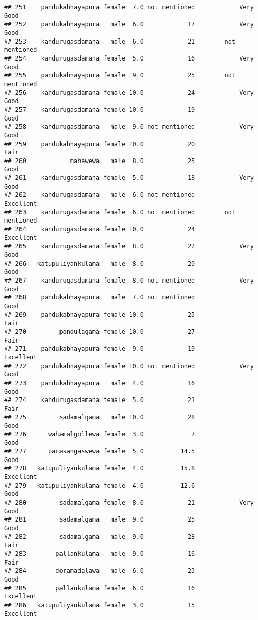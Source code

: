 \documentclass[
]{article}
\begin{document}
\begin{verbatim}
## 251    pandukabhayapura female  7.0 not mentioned            Very Good
## 252    pandukabhayapura   male  6.0            17            Very Good
## 253    kandurugasdamana   male  6.0            21        not mentioned
## 254    kandurugasdamana female  5.0            16            Very Good
## 255    pandukabhayapura female  9.0            25        not mentioned
## 256    kandurugasdamana female 10.0            24            Very Good
## 257    kandurugasdamana female 10.0            19                 Good
## 258    kandurugasdamana   male  9.0 not mentioned            Very Good
## 259    pandukabhayapura female 10.0            20                 Fair
## 260            mahawewa   male  8.0            25                 Good
## 261    kandurugasdamana female  5.0            18            Very Good
## 262    kandurugasdamana   male  6.0 not mentioned            Excellent
## 263    kandurugasdamana female  6.0 not mentioned        not mentioned
## 264    kandurugasdamana female 10.0            24            Excellent
## 265    kandurugasdamana female  8.0            22            Very Good
## 266   katupuliyankulama   male  8.0            20                 Good
## 267    kandurugasdamana female  8.0 not mentioned            Very Good
## 268    pandukabhayapura   male  7.0 not mentioned                 Good
## 269    pandukabhayapura female 10.0            25                 Fair
## 270         pandulagama female 10.0            27                 Fair
## 271    pandukabhayapura female  9.0            19            Excellent
## 272    pandukabhayapura female 10.0 not mentioned            Very Good
## 273    pandukabhayapura   male  4.0            16                 Good
## 274    kandurugasdamana female  5.0            21                 Fair
## 275         sadamalgama   male 10.0            28                 Good
## 276      wahamalgollewa female  3.0             7                 Good
## 277      parasangaswewa female  5.0          14.5                 Good
## 278   katupuliyankulama female  4.0          15.8            Excellent
## 279   katupuliyankulama female  4.0          12.6                 Good
## 280         sadamalgama female  8.0            21            Very Good
## 281         sadamalgama   male  9.0            25                 Good
## 282         sadamalgama   male  9.0            28                 Fair
## 283        pallankulama   male  9.0            16                 Fair
## 284        doramadalawa   male  6.0            23                 Good
## 285        pallankulama female  6.0            16            Excellent
## 286   katupuliyankulama female  3.0            15            Excellent

\end{verbatim}
\end{document}
